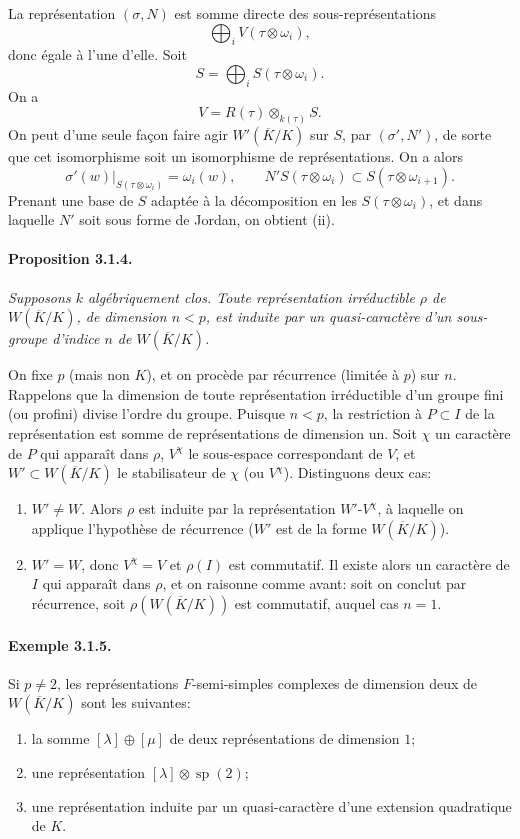 \documentclass[10pt,a4paper]{article}
\providecommand{\sprep}{\operatorname{sp}}
\begin{document}
\clearpage
{}
\hypertarget{authority-40}{}
La représentation \((\sigma,N)\) est somme directe des sous-représentations
\[
\bigoplus_i V(\tau\otimes\omega_i),
\]
donc égale à l'une d'elle. Soit
\[
S=\bigoplus_i S(\tau\otimes\omega_i).
\]
On a
\[
V=R(\tau)\otimes_{k(\tau)}S.
\]
On peut d'une seule façon faire agir \(W'(\overline K/K)\) sur \(S\), par \((\sigma',N')\), de sorte que cet isomorphisme soit un isomorphisme de représentations. On a alors
\[
\sigma'(w)|_{S(\tau\otimes\omega_i)}=\omega_i(w),
\qquad
N'S(\tau\otimes\omega_i)\subset S(\tau\otimes\omega_{i+1}).
\]
Prenant une base de \(S\) adaptée à la décomposition en les \(S(\tau\otimes\omega_i)\), et dans laquelle \(N'\) soit sous forme de Jordan, on obtient (ii).

\paragraph{Proposition 3.1.4.}{\itshape  Supposons \(k\) algébriquement clos. Toute représentation irréductible \(\rho\) de \(W(\overline K/K)\), de dimension \(n<p\), est induite par un quasi-caractère d'un sous-groupe d'indice \(n\) de \(W(\overline K/K)\).\par}

On fixe \(p\) (mais non \(K\)), et on procède par récurrence (limitée à \(p\)) sur \(n\). Rappelons que la dimension de toute représentation irréductible d'un groupe fini (ou profini) divise l'ordre du groupe. Puisque \(n<p\), la restriction à \(P\subset I\) de la représentation est somme de représentations de dimension un. Soit \(\chi\) un caractère de \(P\) qui apparaît dans \(\rho\), \(V^\chi\) le sous-espace correspondant de \(V\), et \(W'\subset W(\overline K/K)\) le stabilisateur de \(\chi\) (ou \(V^\chi\)). Distinguons deux cas:
\begin{enumerate}[label=(\alph*)]
\item \(W'\ne W\). Alors \(\rho\) est induite par la représentation \(W'\)-\(V^\chi\), à laquelle on applique l'hypothèse de récurrence (\(W'\) est de la forme \(W(\overline K/K)\)).
\item \(W'=W\), donc \(V^\chi=V\) et \(\rho(I)\) est commutatif. Il existe alors un caractère de \(I\) qui apparaît dans \(\rho\), et on raisonne comme avant: soit on conclut par récurrence, soit \(\rho(W(\overline K/K))\) est commutatif, auquel cas \(n=1\).
\end{enumerate}

\paragraph{Exemple 3.1.5.} Si \(p\ne2\), les représentations \(F\)-semi-simples complexes de dimension deux de \(W(\overline K/K)\) sont les suivantes:
\begin{enumerate}[label=(\alph*)]
\item la somme \([\lambda]\oplus[\mu]\) de deux représentations de dimension \(1\);
\item une représentation \([\lambda]\otimes\sprep(2)\);
\item une représentation induite par un quasi-caractère d'une extension quadratique de \(K\).
\end{enumerate}
\end{document}
